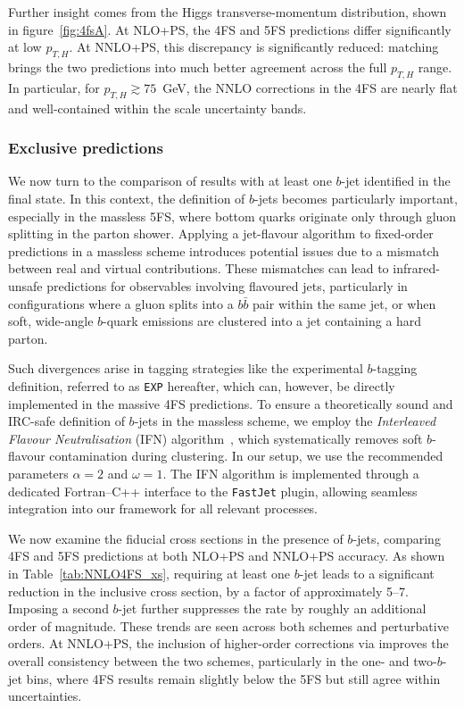 \documentclass[11pt,a4paper]{article}
\begin{document}
Further insight comes from the Higgs transverse-momentum distribution, shown in figure~\ref{fig:4fsA}. At NLO+PS, the 4FS and 5FS predictions differ significantly at low \(p_{T,H}\). At NNLO+PS, this discrepancy is significantly reduced: \minnlo{} matching brings the two predictions into much better agreement across the full \(p_{T,H}\) range. In particular, for \(p_{T,H} \gtrsim 75\)~GeV, the NNLO corrections in the 4FS are nearly flat and well-contained within the scale uncertainty bands.
\subsubsection*{Exclusive predictions}
We now turn to the comparison of results with at least one $b$-jet identified in the final state. In this context, the definition of $b$-jets becomes particularly important, especially in the massless 5FS, where bottom quarks originate only through gluon splitting in the parton shower. Applying a jet-flavour algorithm to fixed-order predictions in a massless scheme introduces potential issues due to a mismatch between real and virtual contributions. These mismatches can lead to infrared-unsafe predictions for observables involving flavoured jets, particularly in configurations where a gluon splits into a $b\bar{b}$ pair within the same jet, or when soft, wide-angle $b$-quark emissions are clustered into a jet containing a hard parton. 

Such divergences arise in tagging strategies like the experimental $b$-tagging definition, referred to as \texttt{EXP} hereafter, which can, however, be directly implemented in the massive 4FS predictions. To ensure a theoretically sound and IRC-safe definition of $b$-jets in the massless scheme, we employ the \emph{Interleaved Flavour Neutralisation} (IFN) algorithm~\cite{Caola:2023wpj}, which systematically removes soft $b$-flavour contamination during clustering. In our setup, we use the recommended parameters $\alpha = 2$ and $\omega = 1$. The IFN algorithm is implemented through a dedicated Fortran--C++ interface to the \texttt{FastJet} plugin, allowing seamless integration into our \POWHEG{} framework for all relevant processes.

We now examine the fiducial cross sections in the presence of $b$-jets, comparing 4FS and 5FS predictions at both NLO+PS and NNLO+PS accuracy. As shown in Table~\ref{tab:NNLO4FS_xs}, requiring at least one $b$-jet leads to a significant reduction in the inclusive cross section, by a factor of approximately 5--7. Imposing a second $b$-jet further suppresses the rate by roughly an additional order of magnitude. These trends are seen across both schemes and perturbative orders. At NNLO+PS, the inclusion of higher-order corrections via \minnlo{} improves the overall consistency between the two schemes, particularly in the one- and two-$b$-jet bins, where 4FS results remain slightly below the 5FS but still agree within uncertainties.
\end{document}
